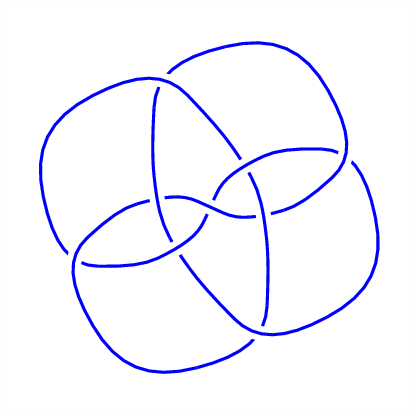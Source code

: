 \begin{figure}[H]
\begin{minipage}[b]{.18\linewidth}
    \end{minipage}
    \begin{minipage}[b]{.18\linewidth}
        \centering
        \includegraphics[width=\linewidth]{../data/9_40.png}
    \end{minipage}
\end{figure}

